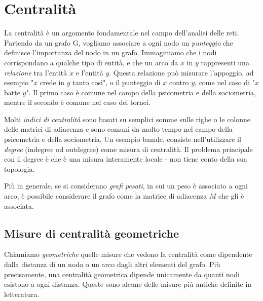 \section{Centralità}
La centralità è un argomento fondamentale nel campo dell'analisi delle reti. Partendo da un grafo G, vogliamo associare a ogni nodo un \textit{punteggio} che definisce l'importanza del nodo in un grafo. Immaginiamo che i nodi corrispondano a qualche tipo di entità, e che un arco da $x$ in $y$ rappresenti una \textit{relazione} tra l'entità $x$ e l'entità $y$. Questa relazione può misurare l'appoggio, ad esempio "$x$ crede in $y$ tanto così", o il punteggio di $x$ contro $y$, come nel caso di "$x$ batte $y$". Il primo caso è comune nel campo della psicometria e della sociometria, mentre il secondo è comune nel caso dei tornei.

Molti \textit{indici di centralità} sono basati su semplici somme sulle righe o le colonne delle matrici di adiacenza e sono comuni da molto tempo nel campo della psicometria e della sociometria. Un esempio banale, consiste nell'utilizzare il \textit{degree} (indegree od outdegree) come misura di centralità. Il problema principale con il degree è che è una misura interamente locale - non tiene conto della sua topologia.

Più in generale, se si considerano \textit{grafi pesati}, in cui un peso è associato a ogni arco, è possibile considerare il grafo come la matrice di adiacenza $M$ che gli è associata.
\subsection{Misure di centralità geometriche}
Chiamiamo \textit{geometriche} quelle misure che vedono la centralità come dipendente dalla distanza di un nodo o un arco dagli altri elementi del grafo. Più precisamente, una centralità geometrica dipende unicamente da quanti nodi esistono a ogni distanza. Queste sono alcune delle misure più antiche definite in letteratura.
